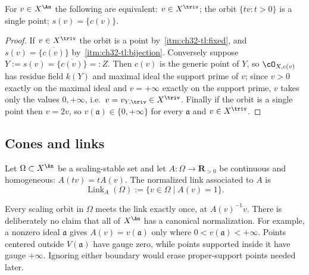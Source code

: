 \begin{corollary}
\label{cor:ch32-orbit-degenerate}
For $v\in X^{\An}$ the following are equivalent: $v\in X^{\triv}$; the
orbit $\{tv:t>0\}$ is a single point; $s(v)=\overline{\{c(v)\}}$.
\end{corollary}

\begin{proof}
If $v\in X^{\triv}$ the orbit is a point by
\,\cref{itm:ch32-tl:fixed}, and
$s(v)=\overline{\{c(v)\}}$ by
\,\cref{itm:ch32-tl:bijection}.  Conversely
suppose $Y:=s(v)=\overline{\{c(v)\}}=:Z$.  Then $c(v)$ is the generic
point of $Y$, so $\cO_{X,c(v)}$ has residue field $k(Y)$ and maximal
ideal the support prime of $v$; since $v>0$ exactly on the maximal ideal
and $v=+\infty$ exactly on the support prime, $v$ takes only the values
$0,+\infty$, i.e.\ $v=v_{Y,\triv}\in X^{\triv}$.  Finally if the orbit
is a single point then $v=2v$, so $v(\mathfrak a)\in\{0,+\infty\}$ for
every $\mathfrak a$ and $v\in X^{\triv}$.
\end{proof}

\subsection{Cones and links}
\label{sec:ch32-links}

\begin{definition}
\label{def:normalized-link}
Let $\Omega\subset X^{\An}$ be a scaling-stable set and let
$A:\Omega\to\mathbf R_{>0}$ be continuous and homogeneous:
$A(tv)=tA(v)$.  The normalized link associated to $A$ is
\begin{equation}
\label{eq:normalized-link}
 \operatorname{Link}_A(\Omega):=\{v\in\Omega\mid A(v)=1\}.
\end{equation}
\end{definition}

Every scaling orbit in $\Omega$ meets the link exactly once, at
$A(v)^{-1}v$.  There is deliberately no claim that all of $X^{\An}$ has
a canonical normalization.  For example, a nonzero ideal $\mathfrak a$
gives $A(v)=v(\mathfrak a)$ only where
$0<v(\mathfrak a)<+\infty$.  Points centered outside
$V(\mathfrak a)$ have gauge zero, while points supported inside it have
gauge $+\infty$.  Ignoring either boundary would erase proper-support
points needed later.

